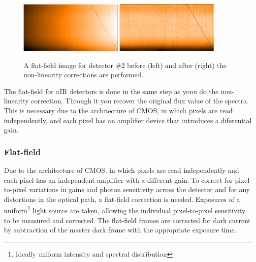\begin{figure}[h]
    \centering
        \includegraphics[width=0.45\textwidth]{figures/reduction/Flat_2.png} %
        \includegraphics[width=0.45\textwidth]{figures/reduction/FlatR_2.png} %
    \caption[Example of flat-field correction.]{A flat-field image for detector \#2 before (left) and after (right) the non-linearity corrections are performed.}
    \label{fig:masterflats_colour}
\end{figure}


The flat-field for nIR detectors is done in the same step as yoou do the non-linearity correction. Through it you recover the original flux value of the spectra. 
This is necessary due to the architecture of CMOS, in which pixels are read independently, and each pixel has an amplifier device that introduces a diferential gain.
\subsubsection{Flat-field}
\label{subsubsec:flat-field}
Due to the architecture of CMOS, in which pixels are read independently and each pixel has an independent amplifier with a different gain.
To correct for pixel-to-pixel variations in gains and photon sensitivity across the detector and for any distortions in the optical path, a flat-field correction is needed.
Exposures of a uniform\footnote{Ideally uniform intensity and spectral distribution} light source are taken, allowing the individual pixel-to-pixel sensitivity to be measured and corrected.
The flat-field frames are corrected for dark current by subtraction of the master dark frame with the appropriate exposure time.

